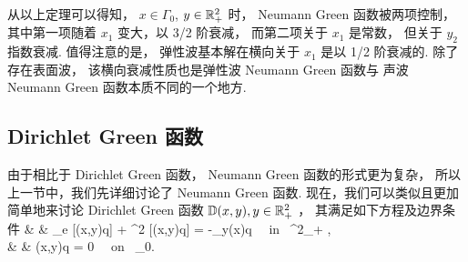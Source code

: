 从以上定理可以得知， $x\in\Gamma_0$, $y\in\mathbb{R}_+^2$ 时， Neumann Green 函数被两项控制， 其中第一项随着 $x_1$ 变大，以 3/2 阶衰减， 而第二项关于 $x_1$ 是常数， 但关于 $y_2$ 指数衰减. 值得注意的是， 弹性波基本解在横向关于 $x_1$ 是以 1/2 阶衰减的. 除了存在表面波， 该横向衰减性质也是弹性波 Neumann Green 函数与 声波 Neumann Green 函数本质不同的一个地方. 




\subsection{Dirichlet Green 函数}\label{Dirichlet Green Tensor}

由于相比于 Dirichlet Green 函数， Neumann Green 函数的形式更为复杂， 所以上一节中，我们先详细讨论了 Neumann Green 函数. 现在，我们可以类似且更加简单地来讨论 Dirichlet Green 函数 $\mathbb{D}(x,y), y\in\mathbb{R}^2_+$ \cite{arens1999}， 其满足如下方程及边界条件 
\be
& & \De_e [\D(x,y)q] + \omega^2 [\D(x,y)q] = -\mathbf{\de}_y(x)q \ \ \mbox{in } \R^2_+ , \label{eq_d1} \\
& &  \D(x,y)q = 0 \ \ \mbox{on } \Ga_0. \label{eq_d2}
\ee 


